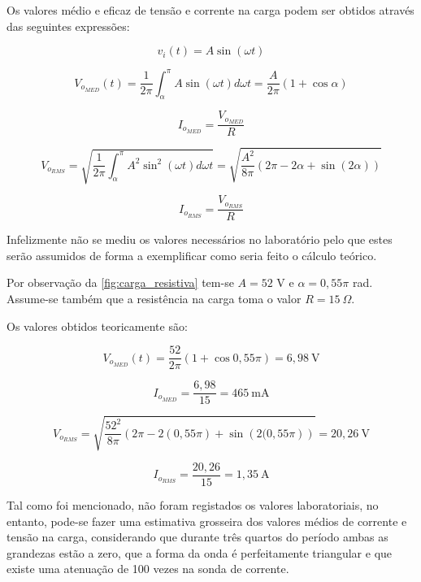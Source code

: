 \documentclass[a4paper,11pt]{article}
\numberwithin{equation}{section}
\begin{document}
Os valores médio e eficaz de tensão e corrente na carga podem ser obtidos através das seguintes expressões:


\begin{equation}
v_i(t)=A \sin(\omega t)
\end{equation}

\begin{equation}
V_{o_{MED}} (t) = \frac{1}{2\pi} \int_{\alpha}^{\pi} A \sin(\omega t) d \omega t = \frac{A}{2\pi} (1+ \cos\alpha)
\end{equation}

\begin{equation}
I_{o_{MED}}= \frac{V_{o_{MED}}}{R}
\end{equation}

\begin{equation}
V_{o_{RMS}} = \sqrt{ \frac{1}{2\pi} \int_{\alpha}^{\pi} A^2 \sin^2 (\omega t) d\omega t} = \sqrt{ \frac{A^2}{8 \pi} (2\pi - 2\alpha + \sin(2\alpha))}
\end{equation}

\begin{equation}
I_{o_{RMS}}= \frac{V_{o_{RMS}}}{R}
\end{equation}


Infelizmente não se mediu os valores necessários no laboratório pelo que estes serão assumidos de forma a exemplificar como seria feito o cálculo teórico.

Por observação da \autoref{fig:carga_resistiva} tem-se $A=52$ V e $\alpha=0,55\pi$ rad. Assume-se também que a resistência na carga toma o valor $R=15~\Omega$.

Os valores obtidos teoricamente são:

\[V_{o_{MED}} (t) = \frac{52}{2\pi} \left(1+ \cos0,55\pi \right) = 6,98~\text{V}\]

\[I_{o_{MED}}= \frac{6,98}{15} = 465~\text{mA}\]

\[V_{o_{RMS}} = \sqrt{ \frac{52^2}{8 \pi} \left(2\pi - 2\left(0,55\pi\right) + \sin\left(2(0,55\pi\right)\right)} = 20,26~\text{V} \]

\[I_{o_{RMS}}= \frac{20,26}{15} = 1,35~\text{A}\]

Tal como foi mencionado, não foram registados os valores laboratoriais, no entanto, pode-se fazer uma estimativa grosseira dos valores médios de corrente e tensão na carga, considerando que durante três quartos do período ambas as grandezas estão a zero, que a forma da onda é perfeitamente triangular e que existe uma atenuação de 100 vezes na sonda de corrente.
\end{document}
